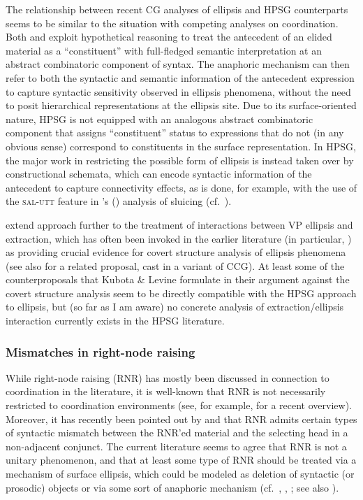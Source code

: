 \documentclass[output=paper,biblatex,babelshorthands,newtxmath,draftmode,colorlinks,citecolor=brown]{langscibook}
\begin{document}
The relationship between recent CG analyses of ellipsis and
HPSG counterparts seems to be similar to the situation with competing
analyses on coordination. Both \citet{barker-sluicing} and
\citet{kubota-levine-pseudo} exploit hypothetical reasoning to treat the
antecedent of an elided material as a ``constituent'' with full-fledged
semantic interpretation at an abstract combinatoric component of
syntax. The anaphoric mechanism can then refer to both the syntactic
and semantic information of the antecedent expression to capture
syntactic sensitivity observed in ellipsis phenomena, without the need
to posit hierarchical representations at the ellipsis site. Due to its
surface-oriented nature, HPSG is not equipped with an analogous
abstract combinatoric component that assigns ``constituent'' status to
expressions that do not (in any obvious sense) correspond to
constituents in the surface representation. In HPSG, the major work in
restricting the possible form of ellipsis is instead
taken over by constructional schemata, which can encode
syntactic information of the antecedent to capture connectivity
effects, as is done, for example, with the use of the 
\textsc{sal-utt} feature in \citeauthor{GSag2000a-u}'s 
(\citeyear[Chapter~8]{GSag2000a-u}) analysis of sluicing
(cf.~).

\largerpage
\citet[Chapter~8]{KubotaLevineBook} extend 
 approach further to the treatment of
interactions between  VP ellipsis and extraction, which has often been
invoked in the earlier literature (in particular, \citealt{kennedy2003})
as providing crucial evidence for  covert structure analysis of
ellipsis phenomena (see also \citealt{Jacobson14ellipsis} for a related
proposal, cast in a variant of CCG).
At least some of the counterproposals that Kubota \& Levine formulate
in their argument against the covert structure analysis seem to be
directly compatible with the HPSG approach to ellipsis,  but (so far
as I am aware) no concrete analysis of extraction/ellipsis
interaction currently exists in the HPSG
literature.


\subsubsection{Mismatches in right-node raising}

While right-node raising (RNR) has mostly been discussed in connection to coordination in
the literature, it is well-known that RNR is not necessarily
restricted to coordination environments (see, for example, \citealt{wilder-ellipsis-handbook}
for a recent overview). Moreover, it
has recently been pointed out by \citet{ACS2016a-u} and \citet{SAHM2019a-u} that RNR 
admits certain types of syntactic mismatch between the RNR'ed material
and the selecting head in a non-adjacent conjunct.
The current literature seems to agree that RNR is not a unitary
phenomenon, and that at least some type of RNR should be treated via a
mechanism of surface ellipsis, which could be modeled as deletion of
syntactic (or prosodic) objects or via some sort of anaphoric
mechanism (cf.\ ,
\citealt{Chaves2014a-u}, 
\citealt{SAHM2019a-u}; see also \citealt[footnote 15]{kubota-levine-pseudo}).
\end{document}
